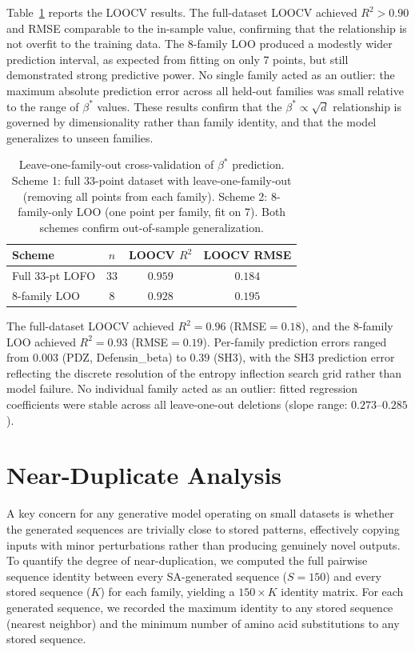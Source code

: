 Table~\ref{tab:beta-loocv} reports the LOOCV results. The full-dataset LOOCV achieved $R^2 > 0.90$ and RMSE comparable to the in-sample value, confirming that the relationship is not overfit to the training data. The 8-family LOO produced a modestly wider prediction interval, as expected from fitting on only 7 points, but still demonstrated strong predictive power. No single family acted as an outlier: the maximum absolute prediction error across all held-out families was small relative to the range of $\beta^*$ values. These results confirm that the $\beta^* \propto \sqrt{d}$ relationship is governed by dimensionality rather than family identity, and that the model generalizes to unseen families.

\begin{table}[ht]
\centering
\caption{Leave-one-family-out cross-validation of $\beta^*$ prediction. Scheme 1: full 33-point dataset with leave-one-family-out (removing all points from each family). Scheme 2: 8-family-only LOO (one point per family, fit on 7). Both schemes confirm out-of-sample generalization.}
\label{tab:beta-loocv}
\small
\begin{tabular}{@{}lccc@{}}
\toprule
Scheme & $n$ & LOOCV $R^2$ & LOOCV RMSE \\
\midrule
Full 33-pt LOFO & 33 & $0.959$ & $0.184$ \\
8-family LOO    &  8 & $0.928$ & $0.195$ \\
\bottomrule
\end{tabular}
\end{table}

The full-dataset LOOCV achieved $R^2{=}0.96$ (RMSE${=}0.18$), and the 8-family LOO achieved $R^2{=}0.93$ (RMSE${=}0.19$). Per-family prediction errors ranged from $0.003$ (PDZ, Defensin\_beta) to $0.39$ (SH3), with the SH3 prediction error reflecting the discrete resolution of the entropy inflection search grid rather than model failure. No individual family acted as an outlier: fitted regression coefficients were stable across all leave-one-out deletions (slope range: $0.273$--$0.285$).

\section{Near-Duplicate Analysis}\label{si:identity-distribution}

A key concern for any generative model operating on small datasets is whether the generated sequences are trivially close to stored patterns, effectively copying inputs with minor perturbations rather than producing genuinely novel outputs. To quantify the degree of near-duplication, we computed the full pairwise sequence identity between every SA-generated sequence ($S{=}150$) and every stored sequence ($K$) for each family, yielding a $150 \times K$ identity matrix. For each generated sequence, we recorded the maximum identity to any stored sequence (nearest neighbor) and the minimum number of amino acid substitutions to any stored sequence.

